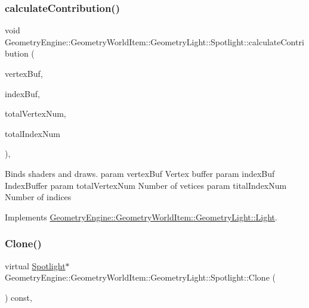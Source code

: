 \subsubsection{\texorpdfstring{calculateContribution()}{calculateContribution()}}
{\footnotesize\ttfamily void Geometry\+Engine\+::\+Geometry\+World\+Item\+::\+Geometry\+Light\+::\+Spotlight\+::calculate\+Contribution (\begin{DoxyParamCaption}\item[{Q\+Open\+G\+L\+Buffer $\ast$}]{vertex\+Buf,  }\item[{Q\+Open\+G\+L\+Buffer $\ast$}]{index\+Buf,  }\item[{unsigned int}]{total\+Vertex\+Num,  }\item[{unsigned int}]{total\+Index\+Num }\end{DoxyParamCaption})\hspace{0.3cm}{\ttfamily [protected]}, {\ttfamily [virtual]}}

Binds shaders and draws. param vertex\+Buf Vertex buffer param index\+Buf Index\+Buffer param total\+Vertex\+Num Number of vetices param tital\+Index\+Num Number of indices 

Implements \mbox{\hyperlink{class_geometry_engine_1_1_geometry_world_item_1_1_geometry_light_1_1_light_a58aa2a3520f7aa2b03afcb4123e7530a}{Geometry\+Engine\+::\+Geometry\+World\+Item\+::\+Geometry\+Light\+::\+Light}}.

\mbox{\label{class_geometry_engine_1_1_geometry_world_item_1_1_geometry_light_1_1_spotlight_a7feb062f72b8110cf7d8d614d2daad92}} 
\subsubsection{\texorpdfstring{Clone()}{Clone()}}
{\footnotesize\ttfamily virtual \mbox{\hyperlink{class_geometry_engine_1_1_geometry_world_item_1_1_geometry_light_1_1_spotlight}{Spotlight}}$\ast$ Geometry\+Engine\+::\+Geometry\+World\+Item\+::\+Geometry\+Light\+::\+Spotlight\+::\+Clone (\begin{DoxyParamCaption}{ }\end{DoxyParamCaption}) const\hspace{0.3cm}{\ttfamily [inline]}, {\ttfamily [virtual]}}

